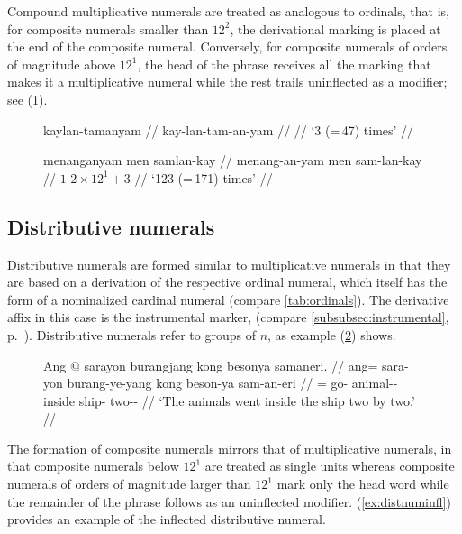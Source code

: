 Compound multiplicative numerals are treated as analogous to ordinals, that is,
for composite numerals smaller than $12^2$, the derivational marking is placed
at the end of the composite numeral. Conversely, for composite numerals of
orders of magnitude above $12^1$, the head of the phrase receives all the
marking that makes it a multiplicative numeral while the rest trails
uninflected as a modifier; see (\ref{ex:mutlnuminfl}).

\begin{figure}[h]
\pex\label{ex:mutlnuminfl}
\a\begingl
	\gla kaylan-tamanyam //
	\glb kay-lan-tam-an-yam //
	 //
	\glft `3\elv{} (=\,47) times' //
\endgl

\a\begingl
	\gla menanganyam men samlan-kay //
	\glb menang-an-yam men sam-lan-kay //
	 {$1$} {$2 \times 12^1 + 3$} //
	\glft `123 (=\,171) times' //
\endgl
\xe
\end{figure}

\subsection{Distributive numerals}

Distributive numerals are formed similar to multiplicative numerals in that
they are based on a derivation of the respective ordinal numeral, which itself
has the form of a nominalized cardinal numeral (compare
\autoref{tab:ordinals}). The derivative affix in this case is the instrumental
marker,  (compare \autoref{subsubsec:instrumental},
p.~\pageref{subsubsec:instrumental}).
Distributive numerals refer to groups of $n$, as example (\ref{ex:distnum})
shows.

\begin{figure}[h]
\ex\label{ex:distnum}
\begingl
	\gla Ang @ sarayon burangjang kong besonya samaneri. //
	\glb ang= sara-yon burang-ye-yang kong beson-ya sam-an-eri //
	\glc \AgtT{}= go-\TplN{} animal-\Pl{}-\Aarg{} inside ship-\Loc{} 
		two-\Nmlz{}-\Ins{} //
	\glft `The animals went inside the ship two by two.' //
\endgl
\xe
\end{figure}

The formation of composite numerals mirrors that of multiplicative
numerals, in that composite numerals below $12^1$ are treated as single units
whereas composite numerals of orders of magnitude larger than $12^1$ mark only
the head word while the remainder of the phrase follows as an uninflected
modifier. (\ref{ex:distnuminfl}) provides an example of the inflected
distributive numeral.

